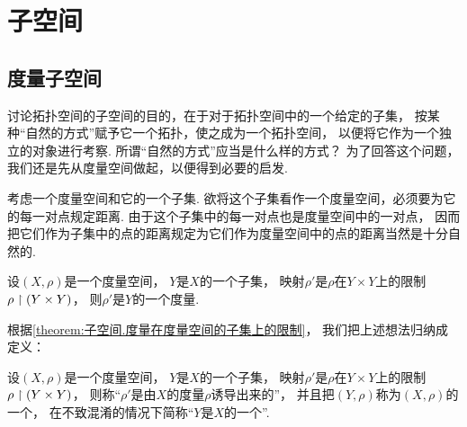\section{子空间}
\subsection{度量子空间}
讨论拓扑空间的子空间的目的，在于对于拓扑空间中的一个给定的子集，
按某种“自然的方式”赋予它一个拓扑，使之成为一个拓扑空间，
以便将它作为一个独立的对象进行考察.
所谓“自然的方式”应当是什么样的方式？
为了回答这个问题，我们还是先从度量空间做起，以便得到必要的启发.

考虑一个度量空间和它的一个子集.
欲将这个子集看作一个度量空间，必须要为它的每一对点规定距离.
由于这个子集中的每一对点也是度量空间中的一对点，
因而把它们作为子集中的点的距离规定为它们作为度量空间中的点的距离当然是十分自然的.

\begin{proposition}\label{theorem:子空间.度量在度量空间的子集上的限制}
设\((X,\rho)\)是一个度量空间，
\(Y\)是\(X\)的一个子集，
映射\(\rho'\)是\(\rho\)在\(Y \times Y\)上的限制\(\rho \upharpoonright (Y \times Y)\)，
则\(\rho'\)是\(Y\)的一个度量.
\end{proposition}

根据\cref{theorem:子空间.度量在度量空间的子集上的限制}，
我们把上述想法归纳成定义：
\begin{definition}
设\((X,\rho)\)是一个度量空间，
\(Y\)是\(X\)的一个子集，
映射\(\rho'\)是\(\rho\)在\(Y \times Y\)上的限制\(\rho \upharpoonright (Y \times Y)\)，
则称“\(\rho'\)是由\(X\)的度量\(\rho\)诱导出来的”，
并且把\((Y,\rho)\)称为\((X,\rho)\)的一个，
在不致混淆的情况下简称“\(Y\)是\(X\)的一个”.
\end{definition}

